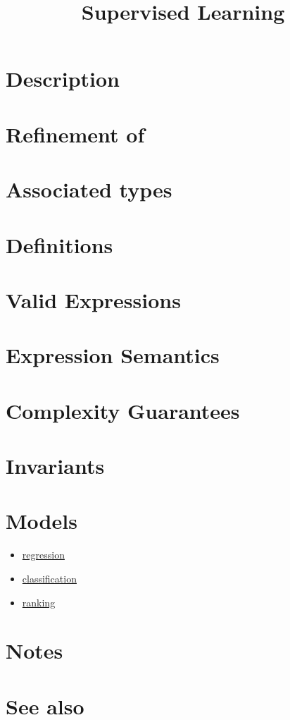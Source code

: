 \documentclass{article}
\begin{document}
\title{Supervised Learning}
\maketitle

\section*{Description}
\section*{Refinement of}
\section*{Associated types}
\section*{Definitions}
\section*{Valid Expressions}
\section*{Expression Semantics}
\section*{Complexity Guarantees}
\section*{Invariants}
\section*{Models}

\begin{itemize}
\item \href{\kmlroot/reference/regression.html}{regression}
\item \href{\kmlroot/reference/classification.html}{classification}
\item \href{\kmlroot/reference/ranking.html}{ranking}
\end{itemize}

\section*{Notes}
\section*{See also}



\end{document}
